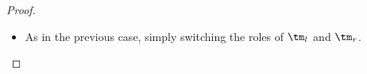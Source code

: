 \begin{proof}
\begin{itemize}
\begin{itemize}
\begin{itemize}
\item \emph{$\var \notin \fv{\tm_l}$ and $\var\in\fv{\tm_r}$}. By , $\var \notin \fv{\tm_l}$ implies $\mtmtwo_l=\disc{\tm_l}{\skelvars \cup \{\var\}} = \disc{\tm_l}{\skelvars} = \mtm_l$. Then:
\[\begin{array}{cllllll}
\mtm\isub\var{\skelu{\var^\taken}}
  &= & 
  \mtm_l\isub\var{\skelu{\var^\taken}}\appt\tm_r\isub\var{\skelu{\var^\taken}} 
\\
  &= & 
  \mtm_l\appt\tm_r\isub\var{\skelu{\var^\taken}} 
  \\
 &=_{\reflemmaeq{disc-useless-var}} &
  \mtmtwo_l\appt\tm_r\isub\var{\skelu{\var^\taken}} 
    \\
   \mbox{(by \ih)}  &\tomark^{k_r} &
\mtmtwo_l \appt \skelu{\mtmtwo_r}
  \\
    &\tomarkwhtwo &
\mtmtwo_l\appt \mtmtwo_r
  &=&
  \mtmtwo
\end{array}\]
where $k_r =_{\ih} \sizet{\mtmtwo_r} - \sizet{\tm_r} -1$.
 Clearly, from $\mtmtwo_l= \mtm_l$ it follows $\sizet{\mtmtwo_l}= \sizet{\mtm_l}$.
Moreover:
\[\begin{array}{lllllll}
k &= & k_r +1
\\
& =_{\ih} & 
\sizet{\mtmtwo_r} - \sizet{\tm_r} -1 +1
\\
& = & 
\sizet{\mtmtwo_r} - \sizet{\tm_r}
\\
& = & 
\sizet{\mtmtwo_l} +\sizet{\mtmtwo_r} - \sizet{\mtm_l} - \sizet{\tm_r}
\\
& = & 
(\sizet{\mtmtwo_l} +\sizet{\mtmtwo_r}+1) - (\sizet{\mtm_l} + \sizet{\tm_r}+1)
\\
& = & 
\sizet{\mtmtwo} - \sizet{\mtm}
\end{array}\]
Then the statement holds, since $\mtm$ starts with $\taken$.
\end{itemize}

\item {} As in the previous case, simply switching the roles of $\tm_l$ and $\tm_r$.
\end{itemize}




\end{itemize}
\end{proof}
